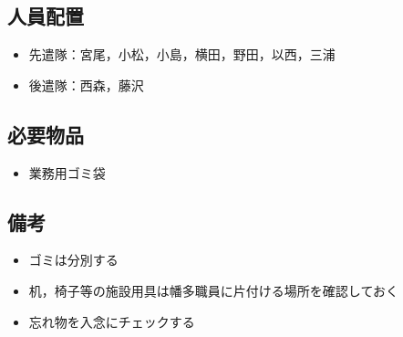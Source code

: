 \subsection{人員配置}
\begin{itemize}
\item 先遣隊：宮尾，小松，小島，横田，野田，以西，三浦
\item 後遣隊：西森，藤沢
\end{itemize}



\subsection{必要物品}
\begin{itemize}
\item 業務用ゴミ袋
\end{itemize}


\subsection{備考}
\begin{itemize}
\item ゴミは分別する
\item 机，椅子等の施設用具は幡多職員に片付ける場所を確認しておく
\item 忘れ物を入念にチェックする
\end{itemize}


%

